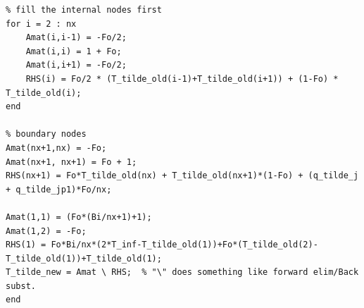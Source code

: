 \documentclass[conf]{new-aiaa}
\begin{document}
\begin{lstlisting}
% fill the internal nodes first
for i = 2 : nx
    Amat(i,i-1) = -Fo/2;
    Amat(i,i) = 1 + Fo;
    Amat(i,i+1) = -Fo/2;
    RHS(i) = Fo/2 * (T_tilde_old(i-1)+T_tilde_old(i+1)) + (1-Fo) * T_tilde_old(i);
end

% boundary nodes
Amat(nx+1,nx) = -Fo;
Amat(nx+1, nx+1) = Fo + 1;
RHS(nx+1) = Fo*T_tilde_old(nx) + T_tilde_old(nx+1)*(1-Fo) + (q_tilde_j + q_tilde_jp1)*Fo/nx;

Amat(1,1) = (Fo*(Bi/nx+1)+1);
Amat(1,2) = -Fo;
RHS(1) = Fo*Bi/nx*(2*T_inf-T_tilde_old(1))+Fo*(T_tilde_old(2)-T_tilde_old(1))+T_tilde_old(1);
T_tilde_new = Amat \ RHS;  % "\" does something like forward elim/Back subst.
end




\end{lstlisting}
\end{document}

